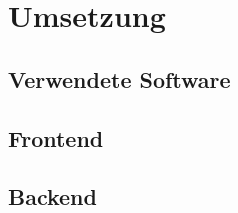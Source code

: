 \chapter{Umsetzung}
\label{chapter:implementation}
    \section{Verwendete Software}
    
    \section{Frontend}
    
    \section{Backend}